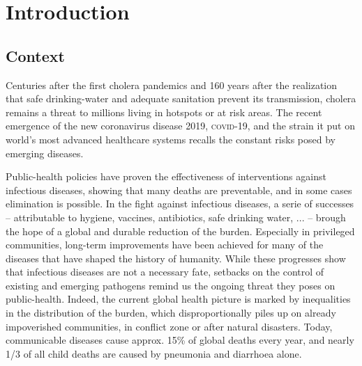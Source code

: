 \chapter*{Introduction} 

 \section{Context}
 Centuries after the first cholera pandemics and 160 years after the realization that safe drinking-water and adequate sanitation prevent its transmission, cholera remains a threat to millions living in hotspots or at risk areas. The recent emergence of the new coronavirus disease 2019, \textsc{covid}-19, and the strain it put on world's most advanced healthcare systems recalls the constant risks posed by emerging diseases. 
 
 Public-health policies have proven the effectiveness of interventions against infectious diseases, showing that many deaths are preventable, and in some cases elimination is possible. In the fight against infectious diseases, a serie of successes -- attributable to \eg hygiene, vaccines, antibiotics, safe drinking water, ... -- brough the hope of a global and durable reduction of the burden. Especially in privileged communities, long-term improvements have been achieved for many of the diseases that have shaped the history of humanity. While these progresses show that infectious diseases are not a necessary fate, setbacks on the control of existing and emerging pathogens remind us the ongoing threat they poses on public-health. 
  Indeed, the current global health picture is marked by inequalities in the distribution of the burden, which disproportionally piles up on already impoverished communities, in conflict zone or after natural disasters. Today, communicable diseases cause approx. 15\% of global deaths every year\cite[-4\baselineskip][tab. 1, excl. non-transmissible neonatal and maternal diseases and nutritional diseases; pre-\textsc{covid}-19 estimates]{Roth:GlobalRegionalNational:2018}, and nearly 1/3 of all child deaths are caused by pneumonia and diarrhoea alone\cite[][\textsc{m} deaths among under 5, every year.]{WHO:EndingPreventableChild:2013}.  
  
